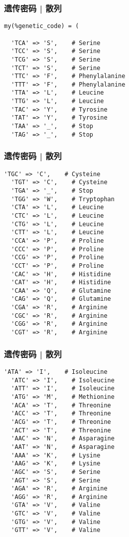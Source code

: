 \begin{frame}[fragile]
  \frametitle{遗传密码 | 散列}
\begin{lstlisting}[firstnumber=12]
  my(%genetic_code) = (
	    
  'TCA' => 'S',    # Serine
  'TCC' => 'S',    # Serine
  'TCG' => 'S',    # Serine
  'TCT' => 'S',    # Serine
  'TTC' => 'F',    # Phenylalanine
  'TTT' => 'F',    # Phenylalanine
  'TTA' => 'L',    # Leucine
  'TTG' => 'L',    # Leucine
  'TAC' => 'Y',    # Tyrosine
  'TAT' => 'Y',    # Tyrosine
  'TAA' => '_',    # Stop
  'TAG' => '_',    # Stop
\end{lstlisting}
\end{frame}

\begin{frame}[fragile]
  \frametitle{遗传密码 | 散列}
\begin{lstlisting}[firstnumber=26,basicstyle=\scriptsize\tt,numberstyle=\tiny]
  'TGC' => 'C',    # Cysteine
  'TGT' => 'C',    # Cysteine
  'TGA' => '_',    # Stop
  'TGG' => 'W',    # Tryptophan
  'CTA' => 'L',    # Leucine
  'CTC' => 'L',    # Leucine
  'CTG' => 'L',    # Leucine
  'CTT' => 'L',    # Leucine
  'CCA' => 'P',    # Proline
  'CCC' => 'P',    # Proline
  'CCG' => 'P',    # Proline
  'CCT' => 'P',    # Proline
  'CAC' => 'H',    # Histidine
  'CAT' => 'H',    # Histidine
  'CAA' => 'Q',    # Glutamine
  'CAG' => 'Q',    # Glutamine
  'CGA' => 'R',    # Arginine
  'CGC' => 'R',    # Arginine
  'CGG' => 'R',    # Arginine
  'CGT' => 'R',    # Arginine
\end{lstlisting}
\end{frame}

\begin{frame}[fragile]
  \frametitle{遗传密码 | 散列}
\begin{lstlisting}[firstnumber=46,basicstyle=\scriptsize\tt,numberstyle=\tiny]
  'ATA' => 'I',    # Isoleucine
  'ATC' => 'I',    # Isoleucine
  'ATT' => 'I',    # Isoleucine
  'ATG' => 'M',    # Methionine
  'ACA' => 'T',    # Threonine
  'ACC' => 'T',    # Threonine
  'ACG' => 'T',    # Threonine
  'ACT' => 'T',    # Threonine
  'AAC' => 'N',    # Asparagine
  'AAT' => 'N',    # Asparagine
  'AAA' => 'K',    # Lysine
  'AAG' => 'K',    # Lysine
  'AGC' => 'S',    # Serine
  'AGT' => 'S',    # Serine
  'AGA' => 'R',    # Arginine
  'AGG' => 'R',    # Arginine
  'GTA' => 'V',    # Valine
  'GTC' => 'V',    # Valine
  'GTG' => 'V',    # Valine
  'GTT' => 'V',    # Valine
\end{lstlisting}
\end{frame}

